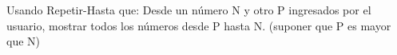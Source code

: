 ﻿
Usando Repetir-Hasta que: Desde un número N y otro P ingresados por el usuario, mostrar todos los números desde P hasta N. (suponer que P es mayor que N)



\volverindice
\newpage
